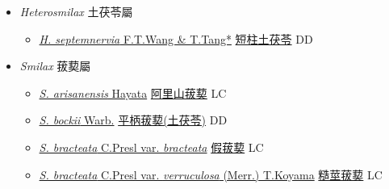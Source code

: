 
  \begin{itemize}
 \item[] \textit{Heterosmilax} 土茯苓屬
                    
  \begin{itemize}
        \item[] \href{http://www.theplantlist.org/tpl1.1/search?q=Heterosmilax+septemnervia}{\textit{H. septemnervia} F.T.Wang \& T.Tang*}   \href{\detokenize{http://taibnet.sinica.edu.tw/chi/taibnet_species_list.php?T2=短柱土茯苓&T2_new_value=true&fr=y}}{短柱土茯苓} DD
  \end{itemize}
 \item[] \textit{Smilax} 菝葜屬
                    
  \begin{itemize}
        \item[] \href{http://www.theplantlist.org/tpl1.1/search?q=Smilax+arisanensis}{\textit{S. arisanensis} Hayata}   \href{\detokenize{http://taibnet.sinica.edu.tw/chi/taibnet_species_list.php?T2=阿里山菝葜&T2_new_value=true&fr=y}}{阿里山菝葜} LC
        \item[] \href{http://www.theplantlist.org/tpl1.1/search?q=Smilax+bockii}{\textit{S. bockii} Warb.}        \href{\detokenize{http://taibnet.sinica.edu.tw/chi/taibnet_species_list.php?T2=平柄菝葜&T2_new_value=true&fr=y}}{平柄菝葜(土茯苓)}   DD
        \item[] \href{http://www.theplantlist.org/tpl1.1/search?q=Smilax+bracteata+var.+bracteata}{\textit{S. bracteata} C.Presl var. \textit{bracteata}}   \href{\detokenize{http://taibnet.sinica.edu.tw/chi/taibnet_species_list.php?T2=假菝葜&T2_new_value=true&fr=y}}{假菝葜} LC
        \item[] \href{http://www.theplantlist.org/tpl1.1/search?q=Smilax+bracteata+var.+verruculosa}{\textit{S. bracteata} C.Presl var. \textit{verruculosa} (Merr.) T.Koyama}   \href{\detokenize{http://taibnet.sinica.edu.tw/chi/taibnet_species_list.php?T2=糙莖菝葜&T2_new_value=true&fr=y}}{糙莖菝葜} LC

\end{itemize}
\end{itemize}
